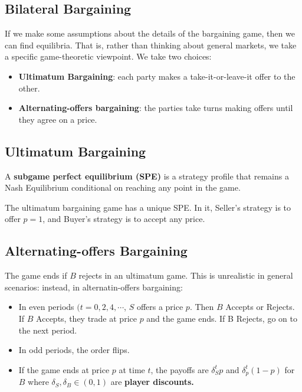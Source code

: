 \documentclass[9pt]{article}
\begin{document}
\begin{multicols}{2}
\subsection{Bilateral Bargaining}

If we make some assumptions about the details of the bargaining game,
then we can find equilibria. That is, rather than thinking about 
general markets, we take a specific game-theoretic viewpoint. We take
two choices:
\begin{itemize}
    \item \textbf{Ultimatum Bargaining}: each party makes a take-it-or-leave-it offer to the other.
    \item \textbf{Alternating-offers bargaining}: the parties take
    turns making offers until they agree on a price.
\end{itemize}

\subsection{Ultimatum Bargaining}

A \textbf{subgame perfect equilibrium (SPE)} is a strategy profile
that remains a Nash Equilibrium conditional on reaching any point in 
the game.

\begin{theorem}
    The ultimatum bargaining game has a unique SPE. In it, Seller's strategy is to offer $p = 1$, and Buyer's strategy is to accept any price.
\end{theorem}

\subsection{Alternating-offers Bargaining}

The game ends if $B$ rejects in an ultimatum game. This is unrealistic in general scenarios: instead, in alternatin-offers
bargaining:
\begin{itemize}
    \item In even periods $(t = 0, 2, 4, \cdots$, $S$ offers a price $p$. Then $B$ Accepts or Rejects. If $B$ Accepts, they trade at price $p$ and the game ends. If B Rejects, go on to the next period. 
    \item In odd periods, the order flips.
    \item If the game ends at price $p$ at time $t$, the payoffs
    are $\delta^{t}_{S}p$ and $\delta^{t}_{p}(1-p)$ for $B$ where $\delta_{S},\delta_{B} \in (0,1)$ are \textbf{player discounts.}
\end{itemize}


\end{multicols}
\end{document}
